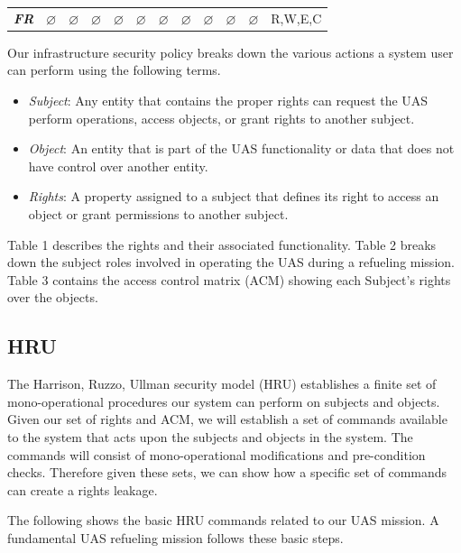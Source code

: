 \documentclass[10pt,journal,compsoc]{IEEEtran}
\begin{document}
\begin{table}[]
{\begin{tabular}{l|lllllllllll}
      {\color[HTML]{009901} \textit{\textbf{FR}}} & {\color[HTML]{009901} $\varnothing$} & {\color[HTML]{009901} $\varnothing$} & {\color[HTML]{009901} $\varnothing$} & {\color[HTML]{009901} $\varnothing$} & {\color[HTML]{009901} $\varnothing$} & {\color[HTML]{009901} $\varnothing$} & {\color[HTML]{009901} $\varnothing$} & {\color[HTML]{009901} $\varnothing$} & {\color[HTML]{009901} $\varnothing$} & {\color[HTML]{009901} $\varnothing$} & {\color[HTML]{009901} R,W,E,C}      
    \end{tabular}}
  \end{table}

  Our infrastructure security policy breaks down the various actions a system user can perform using the following terms. 

  \begin{itemize}
    \item \textit{Subject}: Any entity that contains the proper rights can request the UAS perform operations, access objects, or grant rights to another subject.
    \item \textit{Object}: An entity that is part of the UAS functionality or data that does not have control over another entity. 
    \item \textit{Rights}: A property assigned to a subject that defines its right to access an object or grant permissions to another subject.
  \end{itemize}
  
  Table 1 describes the rights and their associated functionality. Table 2 breaks down the subject roles involved in operating the UAS during a refueling mission. Table 3 contains the access control matrix (ACM) showing each Subject's rights over the objects.
  
  \subsection{HRU}

  The Harrison, Ruzzo, Ullman security model (HRU) establishes a finite set of mono-operational procedures our system can perform on subjects and objects. Given our set of rights and ACM, we will establish a set of commands available to the system that acts upon the subjects and objects in the system. The commands will consist of mono-operational modifications and pre-condition checks. Therefore given these sets, we can show how a specific set of commands can create a rights leakage. 
  
  The following shows the basic HRU commands related to our UAS mission.
  A fundamental UAS refueling mission follows these basic steps. 
\end{document}
